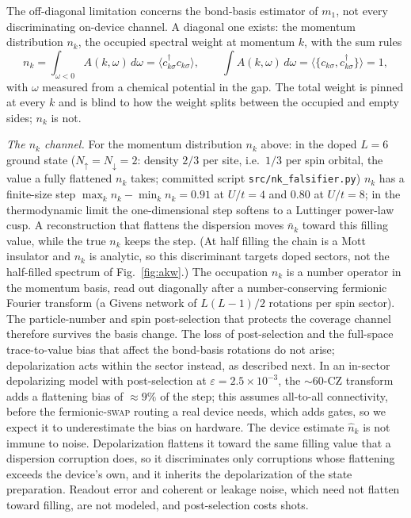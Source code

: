 \documentclass[aps,prb,onecolumn,superscriptaddress,longbibliography,floatfix]{revtex4-2}
\begin{document}
The off-diagonal limitation concerns the bond-basis estimator of $m_1$, not every discriminating on-device channel. A diagonal one exists: the momentum distribution $n_k$, the occupied spectral weight at momentum $k$, with the sum rules
\[
n_k=\int_{\omega<0}A(k,\omega)\,d\omega=\langle c^\dagger_{k\sigma}c_{k\sigma}\rangle,\qquad
\int A(k,\omega)\,d\omega=\langle\{c_{k\sigma},c^\dagger_{k\sigma}\}\rangle=1 ,
\]
with $\omega$ measured from a chemical potential in the gap.
The total weight is pinned at every $k$ and is blind to how the weight splits between the occupied and empty sides; $n_k$ is not.

\emph{The $n_k$ channel.} For the momentum distribution $n_k$ above: in the doped $L=6$ ground state ($N_\uparrow=N_\downarrow=2$: density $2/3$ per site, i.e.\ $1/3$ per spin orbital, the value a fully flattened $n_k$ takes; committed script \texttt{src/\allowbreak nk\_falsifier.py}) $n_k$ has a finite-size step ${\max_k n_k-\min_k n_k}=0.91$ at $U/t=4$ and $0.80$ at $U/t=8$; in the thermodynamic limit the one-dimensional step softens to a Luttinger power-law cusp. A reconstruction that flattens the dispersion moves $\bar n_k$ toward this filling value, while the true $n_k$ keeps the step. (At half filling the chain is a Mott insulator and $n_k$ is analytic, so this discriminant targets doped sectors, not the half-filled spectrum of Fig.~\ref{fig:akw}.) The occupation $n_k$ is a number operator in the momentum basis, read out diagonally after a number-conserving fermionic Fourier transform (a Givens network of $L(L-1)/2$ rotations per spin sector). The particle-number and spin post-selection that protects the coverage channel therefore survives the basis change. The loss of post-selection and the full-space trace-to-value bias that affect the bond-basis rotations do not arise; depolarization acts within the sector instead, as described next. In an in-sector depolarizing model with post-selection at $\varepsilon=2.5\times10^{-3}$, the ${\sim}60$-CZ transform adds a flattening bias of ${\approx}9\%$ of the step; this assumes all-to-all connectivity, before the fermionic-\textsc{swap} routing a real device needs, which adds gates, so we expect it to underestimate the bias on hardware. The device estimate $\widehat n_k$ is not immune to noise. Depolarization flattens it toward the same filling value that a dispersion corruption does, so it discriminates only corruptions whose flattening exceeds the device's own, and it inherits the depolarization of the state preparation. Readout error and coherent or leakage noise, which need not flatten toward filling, are not modeled, and post-selection costs shots.
\end{document}
